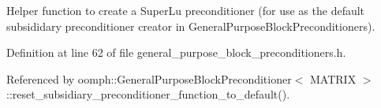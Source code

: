 Helper function to create a Super\+Lu preconditioner (for use as the default subsididary preconditioner creator in General\+Purpose\+Block\+Preconditioners). 



Definition at line 62 of file general\+\_\+purpose\+\_\+block\+\_\+preconditioners.\+h.



Referenced by oomph\+::\+General\+Purpose\+Block\+Preconditioner$<$ M\+A\+T\+R\+I\+X $>$\+::reset\+\_\+subsidiary\+\_\+preconditioner\+\_\+function\+\_\+to\+\_\+default().


